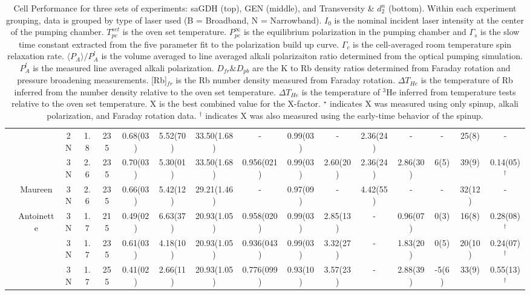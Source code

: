 \begin{table}
\begin{center}
\begin{tabular}{|c|c|ccc|ccc|ccccc|cc|c|}
			& & 2N & 1.8 & 235 & 0.68(03) & 5.52(70) & 33.50(1.68) & - & 0.99(03) & - & 2.36(24) & - & - & 25(8) & -\\
			& & 3N & 2.6 & 235 & 0.70(03) & 5.30(01) & 33.50(1.68) & 0.956(021) & 0.99(03) & 2.60(20) & 2.36(24) & 2.86(30) & 6(5) & 39(9) & 0.14(05)$^\dagger$\\
			\cline{2-16}
			& Maureen & 3N & 2.6 & 235 & 0.66(03) & 5.42(12) & 29.21(1.46) & - & 0.97(09) & - & 4.42(55) & - & - & 32(12) & -\\
			\cline{2-16}
			&Antoinette & 3N & 1.7 & 215 & 0.49(02) & 6.63(37) & 20.93(1.05) & 0.958(020) & 0.99(03) & 2.85(13) & - & 0.96(07) & 0(3) & 16(8) & 0.28(08)$^\dagger$\\
			& & 3N & 1.7 & 235 & 0.61(03) & 4.18(10) & 20.93(1.05) & 0.936(043) & 0.99(03) & 3.32(27) & - & 1.83(20) & 0(5) & 20(10) & 0.24(07)$^\dagger$\\
			& & 3N & 1.7 & 255 & 0.41(02) & 2.66(11) & 20.93(1.05) & 0.776(099) & 0.93(10) & 3.57(23) & - & 2.88(39) & -5(6) & 33(9) & 0.55(13)$^\dagger$\\
			\hline
		\end{tabular}
		\caption
		{Cell Performance for three sets of experiments: saGDH (top), GEN (middle), and Transversity \& $d_2^n$ (bottom).  Within each experiment grouping, data is grouped by type of laser used (B = Broadband, N = Narrowband). $I_0$ is the nominal incident laser intensity at the center of the pumping chamber. $T_{pc}^{set}$ is the oven set temperature. $P_{pc}^\infty$ is the equilibrium polarization in the pumping chamber and $\Gamma_s$ is the slow time constant extracted from the five parameter fit to the polarization build up curve. $\Gamma_c$ is the cell-averaged room temperature spin relaxation rate. $\langle P_A\rangle/P_A^l$ is the volume averaged to line averaged alkali polarizaiton ratio determined from the optical pumping simulation. $P_A^l$ is the measured line averaged alkali polarization. $D_{fr} \& D_{pb}$ are the K to Rb density ratios determined from Faraday rotation and pressure broadening measurements. [Rb]$_{fr}$ is the Rb number density measured from Faraday rotation. $\Delta T_{He}$ is the temperature of Rb inferred from the number density relative to the oven set temperature. $\Delta T_{He}$ is the temperature of $^3$He inferred from temperature tests relative to the oven set temperature. X is the best combined value for the X-factor. $^\star$ indicates X was measured using only spinup, alkali polarization, and Faraday rotation data. $^\dagger$ indicates X was also measured using the early-time behavior of the spinup.}
		\label{table:CellTable}
	\end{center}
\end{table}


